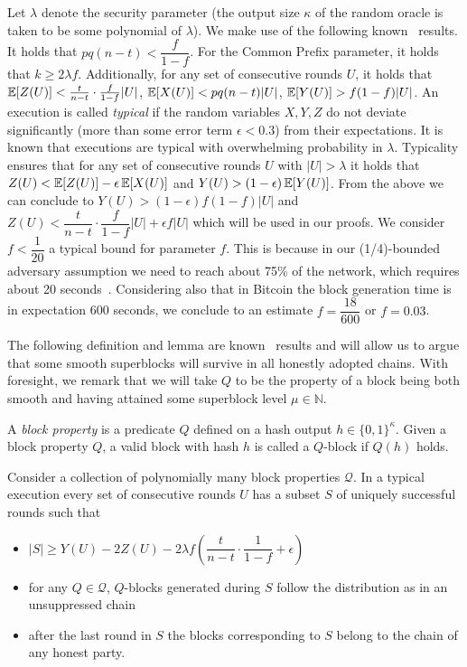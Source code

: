 Let $\lambda$ denote the security parameter (the output size $\kappa$ of the
random oracle is taken to be some polynomial of $\lambda$).
We make use of the following known~\cite{backbone} results.
It holds that $pq(n-t) < \dfrac{f}{1-f}$. For the Common Prefix
parameter, it holds that $k \geq 2\lambda f$.
Additionally, for any set of
consecutive rounds $U$, it holds that
$\operatorname{\mathbb{E}}[Z(U)] < \frac{t}{n-t} \cdot \frac{f}{1 - f}|U|$,
$\operatorname{\mathbb{E}}[X(U)] < pq(n - t)|U|$,
$\operatorname{\mathbb{E}}[Y(U)] > f(1 - f)|U|$.
An execution is called \emph{typical}
if the random variables $X, Y, Z$ do not deviate significantly (more than some
error term $\epsilon < 0.3$) from their expectations. It is known that
executions are typical with overwhelming probability in
$\lambda$. Typicality ensures that for any set of consecutive
rounds $U$ with $|U| > \lambda$ it holds that
$Z(U) < \operatorname{\mathbb{E}}[Z(U)] - \epsilon\operatorname{\mathbb{E}}[X(U)]$ and
$Y(U) > (1 - \epsilon)\operatorname{\mathbb{E}}[Y(U)]$.
From the above we can conclude to
$Y(U) > (1 - \epsilon)f(1-f) \lvert U \rvert$ and
$Z(U) < \dfrac{t}{n-t} \cdot \dfrac{f}{1-f} \lvert U \rvert + \epsilon f \lvert U \rvert $ which will be used in our proofs.
We consider $f < \dfrac{1}{20}$ a typical bound for parameter $f$. This is because in our (1/4)-bounded adversary assumption we need to reach about 75\% of the network, which requires about 20 seconds~\cite{Wattenhofer}. Considering also that in Bitcoin the block generation time is in expectation 600 seconds, we conclude to an estimate $f = \dfrac{18}{600}$ or $f = 0.03$.

The following definition and lemma are known~\cite{dionyziz} results and will
allow us to argue that some smooth superblocks will survive in all honestly
adopted chains. With foresight, we remark that we will take $Q$ to be the
property of a block being both smooth and having attained some superblock level
$\mu \in \mathbb{N}$.

\begin{definition}[$Q$-block]
    A \emph{block property} is a predicate $Q$ defined on a hash output $h \in \{ 0, 1 \}^\kappa$. Given a block property $Q$, a valid block with hash $h$ is called a $Q$-block if $Q(h)$ holds.
\end{definition}

\begin{lemma}[Unsuppressibility]
    Consider a collection of polynomially many block properties $\mathcal{Q}$. In a typical execution every set of consecutive rounds $U$ has a subset $S$ of uniquely successful rounds such that
    \begin{itemize}
        \item $\lvert S \rvert \geq Y(U) - 2Z(U) - 2 \lambda f (\dfrac{t}{n-t} \cdot \dfrac{1}{1-f} + \epsilon)$
        \item for any $Q \in \mathcal{Q}$, $Q$-blocks generated during $S$ follow the distribution as in an unsuppressed chain
        \item after the last round in $S$ the blocks corresponding to $S$ belong
        to the chain of any honest party.
    \end{itemize}
\end{lemma}

